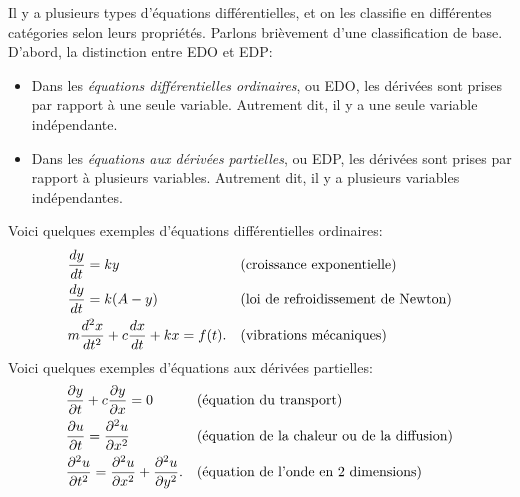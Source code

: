 Il y a plusieurs types d'équations différentielles, et on les classifie en différentes catégories selon leurs propriétés.
Parlons brièvement d'une classification de base.  D'abord, la distinction entre EDO et EDP:
\begin{itemize}
\item
	Dans les \emph{équations différentielles ordinaires}, ou EDO,
	les dérivées sont prises par rapport à une seule variable.  Autrement dit, il y a une seule variable indépendante.

\item
	Dans les \emph{équations aux dérivées partielles}, ou EDP,
	les dérivées sont prises par rapport à plusieurs variables.  Autrement dit, il y a plusieurs variables indépendantes.
\end{itemize}

Voici quelques exemples d'équations différentielles ordinaires:
\begin{align*}
	& \frac{d y}{dt} = ky  & & \text{(croissance exponentielle\index{exponential growth})} \\
	& \frac{d y}{dt} = k(A-y)  & & \text{(\myindex{loi de refroidissement de Newton})} \\
	& m \frac{d^2 x}{dt^2} + c \frac{dx}{dt} + kx = f(t) . & &
\text{(vibrations mécaniques\index{mechanical vibrations})}
\end{align*}
Voici quelques exemples d'équations aux dérivées partielles:
\begin{align*}
	& \frac{\partial y}{\partial t} + c \frac{\partial y}{\partial x} = 0 & &
		\text{(équation du transport\index{Équation du transport})} \\
	& \frac{\partial u}{\partial t} = \frac{\partial^2 u}{\partial x^2}  & &
		\text{(équation de la chaleur ou de la diffusion\index{Équation de la chaleur/diffusion})} \\
	& \frac{\partial^2 u}{\partial t^2} = \frac{\partial^2 u}{\partial x^2} + \frac{\partial^2 u}{\partial y^2} . & &
		\text{(équation de l'onde en 2 dimensions\index{Équation de l'onde en deux dimensions})}
\end{align*}

